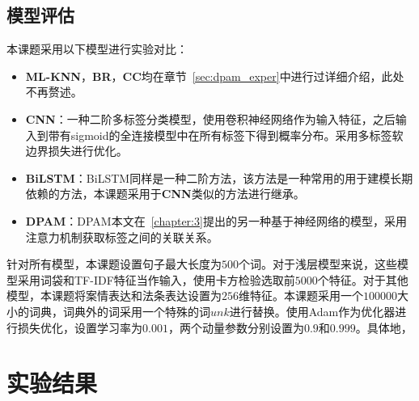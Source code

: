 \subsection{模型评估}
本课题采用以下模型进行实验对比：
\begin{itemize}
    \item \textbf{ML-KNN}，\textbf{BR}，\textbf{CC}均在章节~\ref{sec:dpam_exper}中进行过详细介绍，此处不再赘述。
    \item \textbf{CNN}：一种二阶多标签分类模型，使用卷积神经网络作为输入特征\cite{Kim14}，之后输入到带有sigmoid的全连接模型中在所有标签下得到概率分布。采用多标签软边界损失进行优化。
    \item \textbf{BiLSTM}：BiLSTM\cite{graves2005framewise}同样是一种二阶方法，该方法是一种常用的用于建模长期依赖的方法，本课题采用于\textbf{CNN}类似的方法进行继承。
    \item \textbf{DPAM}：DPAM\cite{DPAM}本文在~\ref{chapter:3}提出的另一种基于神经网络的模型，采用注意力机制获取标签之间的关联关系。
\end{itemize}

针对所有模型，本课题设置句子最大长度为$500$个词。对于浅层模型来说，这些模型采用词袋和TF-IDF特征当作输入，使用卡方检验选取前$5000$个特征\cite{luo2017learning}。对于其他模型，本课题将案情表达和法条表达设置为$256$维特征。本课题采用一个$100000$大小的词典，词典外的词采用一个特殊的词$unk$进行替换。使用Adam作为优化器进行损失优化，设置学习率为$0.001$，两个动量参数分别设置为$0.9$和$0.999$。具体地， 

\section{实验结果}
\label{sec:ran_exper_result}
